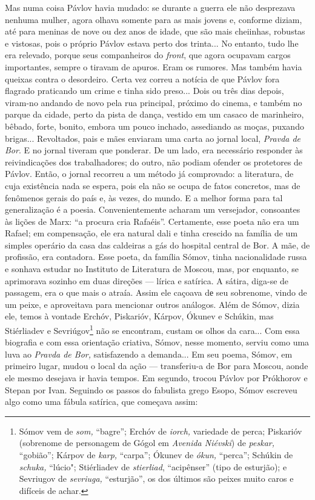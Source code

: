 Mas numa coisa Pávlov havia mudado: se durante a guerra ele não
desprezava nenhuma mulher, agora olhava somente para as mais jovens e,
conforme diziam, até para meninas de nove ou dez anos de idade, que são
mais cheiinhas, robustas e vistosas, pois o próprio Pávlov estava perto
dos trinta... No entanto, tudo lhe era relevado, porque seus
companheiros do \emph{front}, que agora ocupavam cargos importantes,
sempre o tiravam de apuros. Eram os rumores. Mas também havia queixas
contra o desordeiro. Certa vez correu a notícia de que Pávlov fora
flagrado praticando um crime e tinha sido preso... Dois ou três dias
depois, viram-no andando de novo pela rua principal, próximo do cinema,
e também no parque da cidade, perto da pista de dança, vestido em um
casaco de marinheiro, bêbado, forte, bonito, embora um pouco inchado,
assediando as moças, puxando brigas... Revoltados, pais e mães enviaram
uma carta ao jornal local, \emph{Pravda de Bor}. E no jornal tiveram que
ponderar. De um lado, era necessário responder às reivindicações dos
trabalhadores; do outro, não podiam ofender os protetores de Pávlov.
Então, o jornal recorreu a um método já comprovado: a literatura, de
cuja existência nada se espera, pois ela não se ocupa de fatos
concretos, mas de fenômenos gerais do país e, às vezes, do mundo. E a
melhor forma para tal generalização é a poesia. Convenientemente acharam
um versejador, consoantes às lições de Marx: ``a procura cria Rafaéis''.
Certamente, esse poeta não era um Rafael; em compensação, ele era
natural dali e tinha crescido na família de um simples operário da casa
das caldeiras a gás do hospital central de Bor. A mãe, de profissão, era
contadora. Esse poeta, da família Sómov, tinha nacionalidade russa e
sonhava estudar no Instituto de Literatura de Moscou, mas, por enquanto,
se aprimorava sozinho em duas direções --- lírica e satírica. A sátira,
diga-se de passagem, era o que mais o atraía. Assim ele caçoava dе seu
sobrenome, vindo de um peixe, e aproveitava para mencionar outros
análogos. Além de Sómov, dizia ele, temos à vontade Erchóv, Piskarióv,
Kárpov, Ókunev e Schúkin, mas Stiérliadev e Sevriúgov\footnote{Sómov vem
  de \emph{som,} ``bagre''; Erchóv de \emph{iorch,} variedade de perca;
  Piskarióv (sobrenome de personagem de Gógol em \emph{Avenida Niévski})
  de \emph{peskar,} ``gobião''; Kárpov de \emph{karp,} ``carpa''; Ókunev
  de \emph{ókun,} ``perca''; Schúkin de \emph{schuka,} ``lúcio";
  Stiérliadev de \emph{stierliad}, ``acipênser'' (tipo de esturjão); e
  Sevriugov de \emph{sevriuga,} ``esturjão'', os dos últimos são peixes
  muito caros e difíceis de achar.} não se encontram, custam os olhos da
cara... Com essa biografia e com essa orientação criativa, Sómov, nesse
momento, serviu como uma luva ao \emph{Pravda de Bor,} satisfazendo a
demanda... Em seu poema, Sómov, em primeiro lugar, mudou o local da ação
--- transferiu-a de Bor para Moscou, aonde ele mesmo desejava ir havia
tempos. Em segundo, trocou Pávlov por Prókhorov e Stepan por Ivan.
Seguindo os passos do fabulista grego Esopo, Sómov escreveu algo como
uma fábula satírica, que começava assim:

